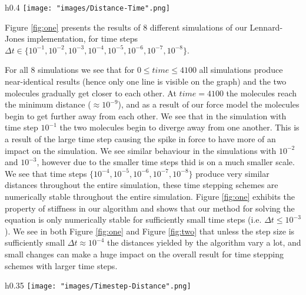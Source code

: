 \documentclass[12pt, a4paper]{article}
\begin{document}
\begin{wrapfigure}{h}{0.4\textwidth}
\texttt{[image: "images/Distance-Time".png]}
\caption{The distance between the particles for $0 \leq time \leq 10000$, for $8$ simulations with different time steps.}
\label{fig:one}
\end{wrapfigure}
\hspace{\parindent} Figure \ref{fig:one} presents the results of $8$ different simulations of our Lennard-Jones implementation, for time steps $\Delta t \in \{ 10^{-1}, 10^{-2}, 10^{-3}, 10^{-4}, 10^{-5}, 10^{-6}, 10^{-7}, 10^{-8}\}$. 
\par For all $8$ simulations we see that for $0\leq time \leq 4100$ all simulations produce near-identical results (hence only one line is visible on the graph) and the two molecules gradually get closer to each other. At $time=4100$ the molecules reach the minimum distance ($\approx 10^{-9}$), and as a result of our force model the molecules begin to get further away from each other. We see that in the simulation with time step $10^{-1}$ the two molecules begin to diverge away from one another. This is a result of the large time step causing the spike in force to have more of an impact on the simulation. We see similar behaviour in the simulations with $10^{-2}$ and $10^{-3}$, however due to the smaller time steps thid is on a much smaller scale. We see that time steps $\{10^{-4}, 10^{-5}, 10^{-6}, 10^{-7}, 10^{-8}\}$ produce very similar distances throughout the entire simulation, these time stepping schemes are numerically stable throughout the entire simulation. Figure \ref{fig:one} exhibits the property of stiffness in our algorithm and shows that our method for solving the equation is only numerically stable for sufficiently small time steps (i.e. $\Delta t\leq 10^{-3}$). We see in both Figure \ref{fig:one} and Figure \ref{fig:two} that unless the step size is sufficiently small $\Delta t \approx 10^{-4}$ the distances yielded by the algorithm vary a lot, and small changes can make a huge impact on the overall result for time stepping schemes with larger time steps. \begin{wrapfigure}{h}{0.35\textwidth}
\texttt{[image: "images/Timestep-Distance".png]}
\caption{The end time distance of each of the simulations.}
\label{fig:two}
\end{wrapfigure}
\end{document}
